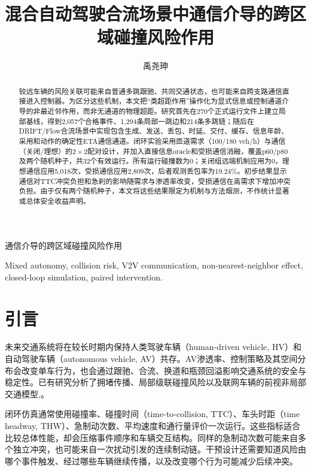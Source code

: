 \documentclass[journal]{IEEEtran}
\begin{document}
\raggedbottom

\title{混合自动驾驶合流场景中通信介导的跨区域碰撞风险作用}

\author{禹尧珅}

%
{通信介导的跨区域碰撞风险作用}

\maketitle

\begin{abstract}
较远车辆的风险关联可能来自普通多跳跟驰、共同交通状态，也可能来自跨支路通信直接进入控制器。为区分这些机制，本文把“类超距作用”操作化为显式信息或控制通道介导的非最近邻作用，而非无通道的物理超距。研究首先在270个正式运行文件上建立局部基线，得到2,057个合格事件、1,294条局部一跳边和214条多跳链；随后在DRIFT/Flow合流场景中实现包含生成、发送、丢包、时延、交付、缓存、信息年龄、采用和动作的确定性ETA通信通道。闭环实验采用匝道需求（100/180 veh/h）与通信（关闭/理想）的$2\times2$配对设计，并加入直接信息oracle和受损通信消融，覆盖p60/p80及两个随机种子，共32个有效运行。所有运行碰撞数为0；关闭组远端机制应用为0，理想通信应用5,018次，受损通信应用2,809次，后者观测丢包率为19.24\%。初步结果显示通信对TTC冲突负担和急刹的影响随需求与渗透率改变，受损通信在高需求下增加冲突负担。由于仅有两个随机种子，本文将这些结果限定为机制与方法烟测，不作统计显著或总体安全收益声明。
\end{abstract}

\begin{IEEEkeywords}
Mixed autonomy, collision risk, V2V communication, non-nearest-neighbor effect, closed-loop simulation, paired intervention.
\end{IEEEkeywords}

\section{引言}\label{sec:introduction}

未来交通系统将在较长时期内保持人类驾驶车辆（human-driven vehicle, HV）和自动驾驶车辆（autonomous vehicle, AV）共存。AV渗透率、控制策略及其空间分布会改变单车行为，也会通过跟驰、合流、换道和瓶颈回溢影响交通系统的安全与稳定性。已有研究分析了拥堵传播\cite{guan2025jam}、局部级联碰撞风险\cite{luo2026crm}以及联网车辆的前视非局部交通模型\cite{huang2022nonlocal},\cite{hui2025lookahead}。

闭环仿真通常使用碰撞率、碰撞时间（time-to-collision, TTC）、车头时距（time headway, THW）、急制动次数、平均速度和通行量评价一次运行。这些指标适合比较总体性能，却会压缩事件顺序和车辆交互结构。同样的急制动次数可能来自多个独立冲突，也可能来自一次扰动引发的连续制动链。干预设计还需要知道风险由哪个事件触发、经过哪些车辆继续传播，以及改变哪个行为可能减少后续冲突。
\end{document}
